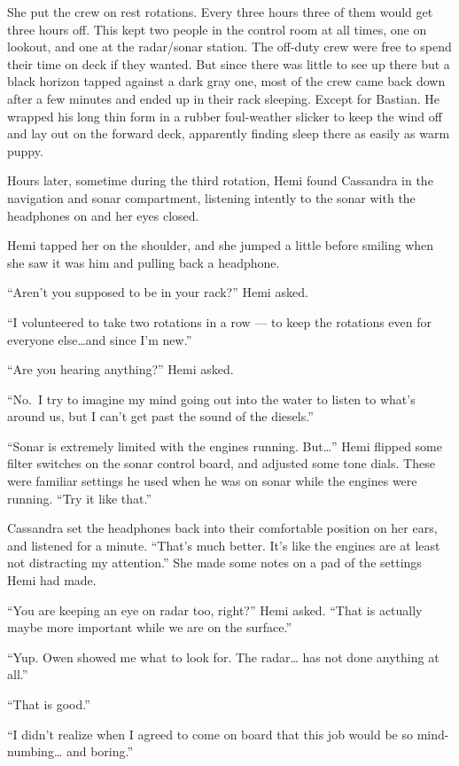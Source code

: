 \documentclass[
]{scrbook}
\begin{document}
She put the crew on rest rotations. Every three hours three of them
would get three hours off. This kept two people in the control room at
all times, one on lookout, and one at the radar/sonar station. The
off-duty crew were free to spend their time on deck if they wanted. But
since there was little to see up there but a black horizon tapped
against a dark gray one, most of the crew came back down after a few
minutes and ended up in their rack sleeping. Except for Bastian. He
wrapped his long thin form in a rubber foul-weather slicker to keep the
wind off and lay out on the forward deck, apparently finding sleep there
as easily as warm puppy.

Hours later, sometime during the third rotation, Hemi found Cassandra in
the navigation and sonar compartment, listening intently to the sonar
with the headphones on and her eyes closed.

Hemi tapped her on the shoulder, and she jumped a little before smiling
when she saw it was him and pulling back a headphone.

``Aren't you supposed to be in your rack?'' Hemi asked.

``I volunteered to take two rotations in a row --- to keep the rotations
even for everyone else\ldots and since I'm new.''

``Are you hearing anything?'' Hemi asked.

``No.~I try to imagine my mind going out into the water to listen to
what's around us, but I can't get past the sound of the diesels.''

``Sonar is extremely limited with the engines running. But\ldots{}''
Hemi flipped some filter switches on the sonar control board, and
adjusted some tone dials. These were familiar settings he used when he
was on sonar while the engines were running. ``Try it like that.''

Cassandra set the headphones back into their comfortable position on her
ears, and listened for a minute. ``That's much better. It's like the
engines are at least not distracting my attention.'' She made some notes
on a pad of the settings Hemi had made.

``You are keeping an eye on radar too, right?'' Hemi asked. ``That is
actually maybe more important while we are on the surface.''

``Yup. Owen showed me what to look for. The radar\ldots{} has not done
anything at all.''

``That is good.''

``I didn't realize when I agreed to come on board that this job would be
so mind-numbing\ldots{} and boring.''
\end{document}
